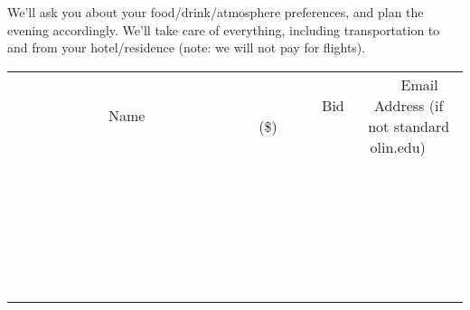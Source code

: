 \documentclass[11pt]{article}
\begin{document}
We'll ask you about your food/drink/atmosphere preferences, and plan the evening accordingly. We'll take care of everything, including transportation to and from your hotel/residence (note: we will not pay for flights).
\\[6ex]
\begin{tabular}{c c c}
~~~~~~~~~~~~~Name~~~~~~~~~~~~~ & ~~~~~~~~~Bid (\$)~~~~~~~~~  & ~~~Email Address (if not standard olin.edu)~~~\\
 & & \\
\hline
 & & \\
\hline
 & & \\
\hline
 & & \\
\hline
 & & \\
\hline
 & & \\
\hline
 & & \\
\hline
 & & \\
\hline
 & & \\
\hline
 & & \\
\hline
 & & \\
\hline
 & & \\
\hline
 & & \\
\hline
 & & \\
\hline
 & & \\
\hline
 & & \\
\hline
 & & \\
\hline
 & & \\
\hline
 & & \\
\hline
 & & \\
\hline
 & & \\
\hline
 & & \\
\hline
 & & \\
\hline
 & & \\
\hline
 & & \\
\hline
 & & \\
\hline
\end{tabular}
\newpage
\end{document}
